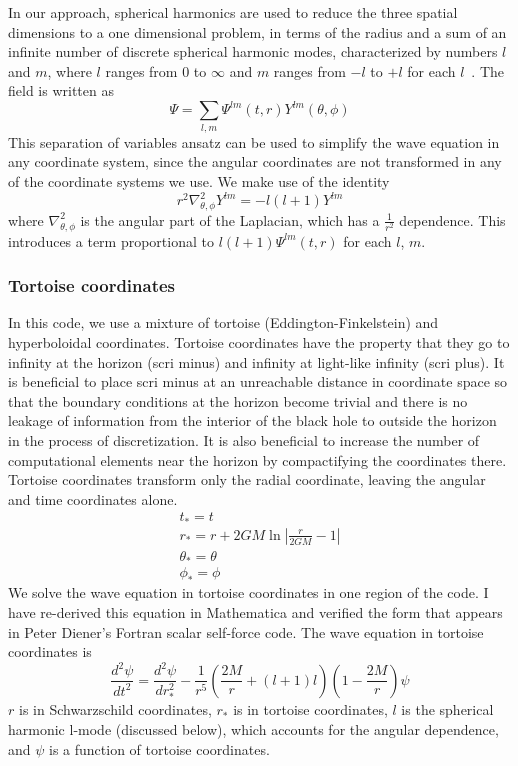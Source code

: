 In our approach, spherical harmonics are used to reduce the three spatial dimensions to a one dimensional problem, in terms of the radius and a sum of an infinite number of discrete spherical harmonic modes, characterized by numbers $l$ and $m$, where $l$ ranges from $0$ to $\infty$ and  $m$ ranges from $-l$ to $+l$ for each $l$~\cite{poisson_pound_vega_living_review}. The field is written as
\begin{equation}
  \Psi=\sum_{l,m}\Psi^{lm}(t,r)Y^{lm}(\theta,\phi)
\end{equation}
This separation of variables ansatz can be used to simplify the wave equation in any coordinate system, since the angular coordinates are not transformed in any of the coordinate systems we use. We make use of the identity
\begin{equation}
  r^2\nabla_{\theta,\phi}^2Y^{lm}=-l(l+1)Y^{lm}
\end{equation}
where $\nabla_{\theta,\phi}^2$ is the angular part of the Laplacian, which has a $\frac{1}{r^2}$ dependence. This introduces a term proportional to $l(l+1)\Psi^{lm}(t,r)$ for each $l$, $m$. 

\subsubsection{Tortoise coordinates}
In this code, we use a mixture of tortoise (Eddington-Finkelstein) and hyperboloidal coordinates. Tortoise coordinates have the property that they go to infinity at the horizon (scri minus) and infinity at light-like infinity (scri plus). It is beneficial to place scri minus at an unreachable distance in coordinate space so that the boundary conditions at the horizon become trivial and there is no leakage of information from the interior of the black hole to outside the horizon in the process of discretization. It is also beneficial to increase the number of computational elements near the horizon by compactifying the coordinates there. Tortoise coordinates transform only the radial coordinate, leaving the angular and time coordinates alone.~\cite{Wald}
\begin{eqnarray}
  t_*=t\\
  r_*=r+2GM\ln|\frac{r}{2GM}-1|\\
  \theta_*=\theta\\
  \phi_*=\phi
\end{eqnarray}
We solve the wave equation in tortoise coordinates in one region of the code. I have re-derived this equation in Mathematica and verified the form that appears in Peter Diener's Fortran scalar self-force code. The wave equation in tortoise coordinates is
\begin{equation}
  \frac{d^2\psi}{dt^2}=\frac{d^2\psi}{dr_*^2}-\frac{1}{r^5}(\frac{2M}{r}+(l+1)l)(1-\frac{2M}{r})\psi
\end{equation}
$r$ is in Schwarzschild coordinates, $r_*$ is in tortoise coordinates, $l$ is the spherical harmonic l-mode (discussed below), which accounts for the angular dependence, and $\psi$ is a function of tortoise coordinates.


